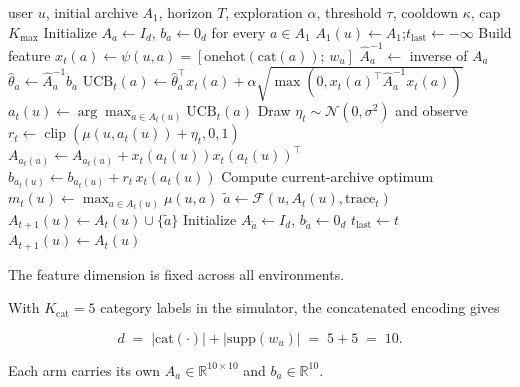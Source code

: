 \documentclass{article} %
\begin{document}
\begin{algorithm}[h]
\caption{Disjoint LinUCB with growing arm set (per-user)}
\label{alg:disjoint-linucb}
\begin{algorithmic}[1]
\Require user $u$, initial archive $A_1$, horizon $T$, exploration $\alpha$, threshold $\tau$, cooldown $\kappa$, cap $K_{\max}$
\State Initialize $A_a \gets I_d$, $b_a \gets 0_d$ for every $a \in A_1$
\State $A_1(u) \gets A_1$;\quad $t_{\text{last}} \gets -\infty$
        \State Build feature $x_t(a) \gets \psi(u, a) = [\mathrm{onehot}(\mathrm{cat}(a));\, w_u]$
        \State $\widehat{A}_a^{-1} \gets$ inverse of $A_a$
        \State $\hat\theta_a \gets \widehat{A}_a^{-1} b_a$
        \State $\mathrm{UCB}_t(a) \gets \hat\theta_a^\top x_t(a) + \alpha \sqrt{\max(0, x_t(a)^\top \widehat{A}_a^{-1} x_t(a))}$
    \EndFor
    \State $a_t(u) \gets \arg\max_{a \in A_t(u)} \mathrm{UCB}_t(a)$
    \State Draw \(\eta_t\sim\mathcal N(0,\sigma^2)\) and observe
    \(r_t\gets\operatorname{clip}(\mu(u,a_t(u))+\eta_t,0,1)\)
    \State $A_{a_t(u)} \gets A_{a_t(u)} + x_t(a_t(u)) x_t(a_t(u))^\top$
    \State $b_{a_t(u)} \gets b_{a_t(u)} + r_t \, x_t(a_t(u))$
    \State Compute current-archive optimum $m_t(u) \gets \max_{a \in A_t(u)} \mu(u, a)$
        \State $\tilde a \gets \mathcal{F}(u, A_t(u), \text{trace}_t)$ 
        \State $A_{t+1}(u) \gets A_t(u) \cup \{\tilde a\}$
        \State Initialize $A_{\tilde a} \gets I_d$, $b_{\tilde a} \gets 0_d$
        \State $t_{\text{last}} \gets t$
    \Else
        \State $A_{t+1}(u) \gets A_t(u)$
    \EndIf
\EndFor
\end{algorithmic}
\end{algorithm}

The feature dimension is fixed across all environments.

With \(K_{\mathrm{cat}}=5\) category labels in the simulator, the concatenated
encoding gives

\begin{equation}
\label{eq:app-impl-d}
d \;=\; |\mathrm{cat}(\cdot)| + |\mathrm{supp}(w_u)| \;=\; 5 + 5 \;=\; 10.
\end{equation}

Each arm carries its own $A_a \in \mathbb{R}^{10\times 10}$ and $b_a \in \mathbb{R}^{10}$.
\end{document}
